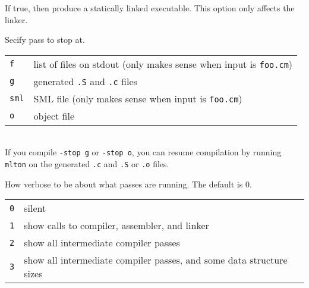 \begin{description}
If true, then produce a statically linked executable.  This option only
affects the linker.

Secify pass to stop at.\\
\begin{tabular}{ll}
{\tt f} & list of files on stdout (only makes sense when input is {\tt foo.cm})\\
{\tt g} & generated {\tt .S} and {\tt .c} files\\
{\tt sml} & SML file (only makes sense when input is {\tt foo.cm})\\
{\tt o} & object file\\
\end{tabular}\\
If you compile {\tt -stop g} or {\tt -stop o}, you can resume compilation by
running {\tt mlton} on the generated {\tt .c} and {\tt .S} or {\tt .o} files.

How verbose to be about what passes are running.  The default is 0.\\
\begin{tabular}{ll}
{\tt 0} & silent\\
{\tt 1} & show calls to compiler, assembler, and linker\\
{\tt 2} & show all intermediate compiler passes\\
{\tt 3} & show all intermediate compiler passes, and some data structure sizes\\
\end{tabular}\\

\end{description}

%
%
%
%
%
%


